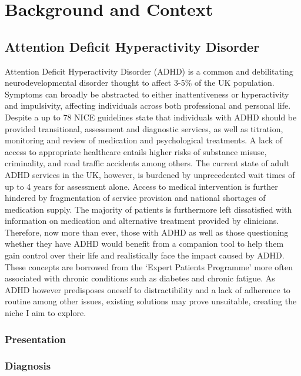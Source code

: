 \documentclass[../main.tex]{subfiles}
\begin{document}
\section{Background and Context}

\subsection{Attention Deficit Hyperactivity Disorder}
Attention Deficit Hyperactivity Disorder (ADHD) is a common and debilitating neurodevelopmental disorder thought to affect 3-5\% of the UK population. Symptoms can broadly be abstracted to either inattentiveness or hyperactivity and impulsivity, affecting individuals across both professional and personal life. Despite a up to 78%
NICE guidelines state that individuals with ADHD should be provided  transitional, assessment and diagnostic services, as well as titration, monitoring and review of medication and psychological treatments. A lack of access to appropriate healthcare entails higher risks of substance misuse, criminality, and road traffic accidents among others. The current state of adult ADHD services in the UK, however, is burdened by unprecedented wait times of up to 4 years for assessment alone.  Access to medical intervention is further hindered by  fragmentation of service provision and national shortages of medication supply. The majority of patients is furthermore left dissatisfied with information on medication and alternative treatment provided by clinicians.
Therefore, now more than ever, those with ADHD as well as those questioning whether they have ADHD would benefit from a companion tool to help them gain control over their life and realistically face the impact caused by ADHD. These concepts are borrowed from the ‘Expert Patients Programme’ more often associated with chronic conditions such as diabetes and chronic fatigue. As ADHD however predisposes oneself to distractibility and a lack of adherence to routine among other issues, existing solutions may prove unsuitable, creating the niche I aim to explore. 

\subsubsection{Presentation}
\subsubsection{Diagnosis}
\end{document}
